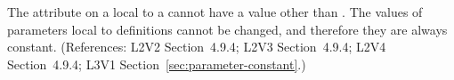 The  attribute on a \Parameter local to a \KineticLaw cannot
have a value other than .  The values of parameters local to
\KineticLaw definitions cannot be changed, and therefore they are always
constant.  (References: L2V2 Section~4.9.4; L2V3
Section~4.9.4; L2V4 Section~4.9.4; L3V1 Section~\ref{sec:parameter-constant}.)
